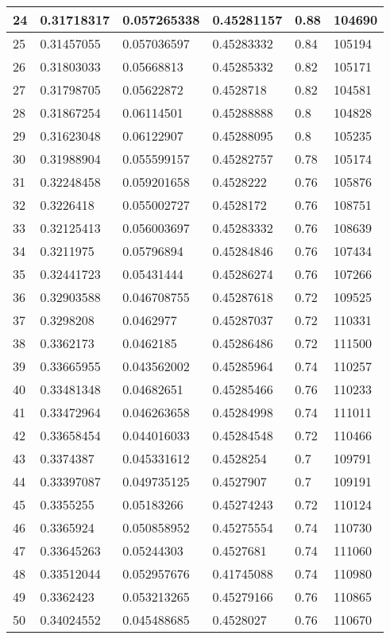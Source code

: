\begin{longtable}{|l|l|l|l|l|l|}
24 & 0.31718317 & 0.057265338 & 0.45281157 & 0.88 & 104690 \\ \hline 
25 & 0.31457055 & 0.057036597 & 0.45283332 & 0.84 & 105194 \\ \hline 
26 & 0.31803033 & 0.05668813 & 0.45285332 & 0.82 & 105171 \\ \hline 
27 & 0.31798705 & 0.05622872 & 0.4528718 & 0.82 & 104581 \\ \hline 
28 & 0.31867254 & 0.06114501 & 0.45288888 & 0.8 & 104828 \\ \hline 
29 & 0.31623048 & 0.06122907 & 0.45288095 & 0.8 & 105235 \\ \hline 
30 & 0.31988904 & 0.055599157 & 0.45282757 & 0.78 & 105174 \\ \hline 
31 & 0.32248458 & 0.059201658 & 0.4528222 & 0.76 & 105876 \\ \hline 
32 & 0.3226418 & 0.055002727 & 0.4528172 & 0.76 & 108751 \\ \hline 
33 & 0.32125413 & 0.056003697 & 0.45283332 & 0.76 & 108639 \\ \hline 
34 & 0.3211975 & 0.05796894 & 0.45284846 & 0.76 & 107434 \\ \hline 
35 & 0.32441723 & 0.05431444 & 0.45286274 & 0.76 & 107266 \\ \hline 
36 & 0.32903588 & 0.046708755 & 0.45287618 & 0.72 & 109525 \\ \hline 
37 & 0.3298208 & 0.0462977 & 0.45287037 & 0.72 & 110331 \\ \hline 
38 & 0.3362173 & 0.0462185 & 0.45286486 & 0.72 & 111500 \\ \hline 
39 & 0.33665955 & 0.043562002 & 0.45285964 & 0.74 & 110257 \\ \hline 
40 & 0.33481348 & 0.04682651 & 0.45285466 & 0.76 & 110233 \\ \hline 
41 & 0.33472964 & 0.046263658 & 0.45284998 & 0.74 & 111011 \\ \hline 
42 & 0.33658454 & 0.044016033 & 0.45284548 & 0.72 & 110466 \\ \hline 
43 & 0.3374387 & 0.045331612 & 0.4528254 & 0.7 & 109791 \\ \hline 
44 & 0.33397087 & 0.049735125 & 0.4527907 & 0.7 & 109191 \\ \hline 
45 & 0.3355255 & 0.05183266 & 0.45274243 & 0.72 & 110124 \\ \hline 
46 & 0.3365924 & 0.050858952 & 0.45275554 & 0.74 & 110730 \\ \hline 
47 & 0.33645263 & 0.05244303 & 0.4527681 & 0.74 & 111060 \\ \hline 
48 & 0.33512044 & 0.052957676 & 0.41745088 & 0.74 & 110980 \\ \hline 
49 & 0.3362423 & 0.053213265 & 0.45279166 & 0.76 & 110865 \\ \hline 
50 & 0.34024552 & 0.045488685 & 0.4528027 & 0.76 & 110670 \\ \hline 
\end{longtable}